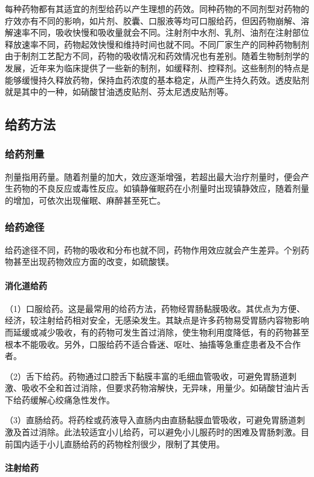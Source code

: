 每种药物都有其适宜的剂型给药以产生理想的药效。同种药物的不同剂型对药物的疗效亦有不同的影响，如片剂、胶囊、口服液等均可口服给药，但因药物崩解、溶解速率不同，吸收快慢和吸收量就会不同。注射剂中水剂、乳剂、油剂在注射部位释放速率不同，药物起效快慢和维持时间也就不同。不同厂家生产的同种药物制剂由于制剂工艺配方不同，药物的吸收情况和药效情况也有差别。随着生物制剂学的发展，近年来为临床提供了一些新的制剂，如缓释剂、控释剂。这些制剂的特点是能够缓慢持久释放药物，保持血药浓度的基本稳定，从而产生持久药效。透皮贴剂就是其中的一种，如硝酸甘油透皮贴剂、芬太尼透皮贴剂等。

\subsection{给药方法}

\subsubsection{给药剂量}

剂量指用药量。随着剂量的加大，效应逐渐增强，若超出最大治疗剂量时，便会产生药物的不良反应或毒性反应。如镇静催眠药在小剂量时出现镇静效应，随着剂量的增加，可依次出现催眠、麻醉甚至死亡。

\subsubsection{给药途径}

给药途径不同，药物的吸收和分布也就不同，药物作用效应就会产生差异。个别药物甚至出现药物效应方面的改变，如硫酸镁。
\paragraph{消化道给药}

（1）口服给药。这是最常用的给药方法，药物经胃肠黏膜吸收。其优点为方便、经济，较注射给药相对安全，无感染发生。其缺点是许多药物易受胃肠内容物影响而延缓或减少吸收，有的药物可发生首过消除，使生物利用度降低，有的药物甚至根本不能吸收。另外，口服给药不适合昏迷、呕吐、抽搐等急重症患者及不合作者。

（2）舌下给药。药物通过口腔舌下黏膜丰富的毛细血管吸收，可避免胃肠道刺激、吸收不全和首过消除，但要求药物溶解快，无异味，用量少。如硝酸甘油片舌下给药缓解心绞痛急性发作。

（3）直肠给药。将药栓或药液导入直肠内由直肠黏膜血管吸收，可避免胃肠道刺激及首过消除。此法较适宜小儿给药，可以避免小儿服药时的困难及胃肠刺激。目前国内适于小儿直肠给药的药物栓剂很少，限制了其使用。
\paragraph{注射给药}

